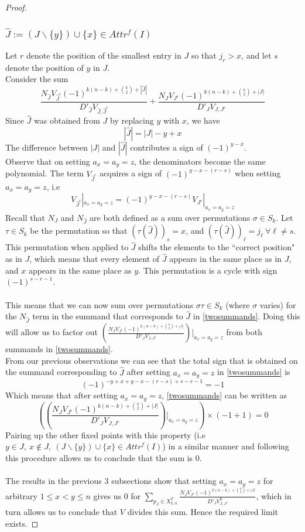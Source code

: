 \documentclass[10pt,a4paper]{amsart}
\begin{document}
\begin{proof}
\subsubsection{$\hat{J}:=(J\backslash\{y\})\cup\{x\}\in Attr^{f}(I)$}
Let $r$ denote the position of the smallest entry in $J$ so that $j_{r}>x$, and let $s$ denote the position of $y$ in $J$. \\
Consider the sum 
\begin{equation}\label{twosummands}
    \frac{N_{\hat{J}}V_{\hat{J}^{c}}(-1)^{k(n-k)+\binom{k}{2}+|\hat{J}|}}{D'_{\hat{J}}V_{\hat{J},\hat{J}^{c}}}+
    \frac{N_{J}V_{J^{c}}(-1)^{k(n-k)+\binom{k}{2}+|J|}}{D'_{J}V_{J,J^{c}}}
\end{equation}
Since $\hat{J}$ was obtained from $J$ by replacing $y$ with $x$, we have \[|\hat{J}|=|J|-y+x\]
The difference between $|J|$ and $|\hat{J}|$ contributes a sign of $(-1)^{y-x}$.\\
Observe that on setting $a_{x}=a_{y}=z$, the denominators become the same polynomial. The term $V_{\hat{J}^{c}}$ acquires a sign of $(-1)^{y-x-(r-s)}$ when setting $a_{x}=a_{y}=z$, i.e 
\[V_{\hat{J}^{c}}|_{a_{x}=a_{y}=z}=(-1)^{y-x-(r-s)}V_{J^{c}}|_{a_{x}=a_{y}=z}\]
Recall that $N_{J}$ and $N_{\hat{J}}$ are both defined as a sum over permutations $\sigma\in S_{k}$. Let $\tau\in S_{k}$ be the permutation so that $(\tau(\hat{J}))_{s}=x$, and $(\tau(\hat{J}))_{\ell}=j_{\ell}\ \forall \ell\neq s$. This permutation when applied to $\hat{J}$ shifts the elements to the ``correct position" as in $J$, which means that every element of $\hat{J}$ appears in the same place as in $J$, and $x$ appears in the same place as $y$. This permutation is a cycle with sign $(-1)^{s-r-1}$.\\\\
This means that we can now sum over permutations $\sigma\tau\in S_{k}$ (where $\sigma$ varies) for the $N_{\hat{J}}$ term in the summand that corresponds to $\hat{J}$ in \eqref{twosummands}. Doing this will allow us to factor out $\left(\frac{N_{J}V_{J^{c}}(-1)^{k(n-k)+\binom{k}{2}+|J|}}{D'_{J}V_{J,J^{c}}}\right)|_{a_{x}=a_{y}=z}$ from both summands in \eqref{twosummands}.\\  
From our previous observations we can see that the total sign that is obtained on the summand corresponding to $\hat{J}$ after setting $a_{x}=a_{y}=z$ in \eqref{twosummands} is \[(-1)^{-y+x+y-x-(r-s)+s-r-1}=-1\]
Which means that after setting $a_{x}=a_{y}=z$, \eqref{twosummands} can be written as
\[\left(\left(\frac{N_{J}V_{J^{c}}(-1)^{k(n-k)+\binom{k}{2}+|J|}}{D'_{J}V_{J,J^{c}}}\right)|_{a_{x}=a_{y}=z}\right)\times(-1+1)=0\]
Pairing up the other fixed points with this property (i.e $y\in J,\ x\notin J,\ (J\backslash\{y\})\cup\{x\}\in Attr^{f}(I)$) in a similar manner and following this procedure allows us to conclude that the sum is 0.\\\\
The results in the previous 3 subsections show that setting $a_{x}=a_{y}=z$ for arbitrary $1\leq x<y\leq n$ gives us 0 for $\sum_{p_{J}\in X_{k,n}^{T}}\frac{N_{J}V_{J^{c}}(-1)^{k(n-k)+\binom{k}{2}+|J|}}{D'_{J}V_{J,J^{c}}^{\hbar}}$, which in turn allows us to conclude that $V$ divides this sum. Hence the required limit exists.
\end{proof}
\end{document}
